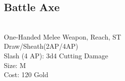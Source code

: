 \subsection{Battle Axe}\label{weapon:battleAxe}\\
One-Handed Melee Weapon,  Reach, ST\\
Draw/Sheath(2AP/4AP)\\
Slash (4 AP): 3d4 Cutting Damage\\
Size: M\\
Cost: 120 Gold\\
